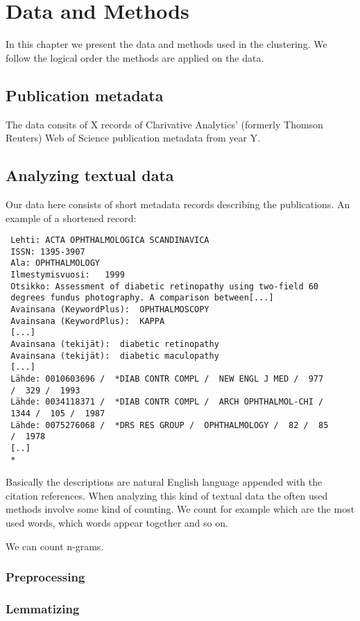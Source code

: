 \chapter{Data and Methods}
\label{chapter:methods}
In this chapter we present the data and methods used in the 
clustering. We follow the logical order the methods are applied on 
the data.

\section{Publication metadata}
The data consits of X records of Clarivative Analytics' 
(formerly Thomson Reuters) Web of Science publication metadata 
from year Y.


\section{Analyzing textual data}
Our data here consists of short metadata records describing the 
publications. An example of a shortened record:
\begin{verbatim}
 Lehti: ACTA OPHTHALMOLOGICA SCANDINAVICA
 ISSN: 1395-3907
 Ala: OPHTHALMOLOGY
 Ilmestymisvuosi:   1999
 Otsikko: Assessment of diabetic retinopathy using two-field 60 
 degrees fundus photography. A comparison between[...]
 Avainsana (KeywordPlus):  OPHTHALMOSCOPY
 Avainsana (KeywordPlus):  KAPPA
 [...]
 Avainsana (tekijät):  diabetic retinopathy
 Avainsana (tekijät):  diabetic maculopathy
 [...]
 Lähde: 0010603696 /  *DIAB CONTR COMPL /  NEW ENGL J MED /  977 
 /  329 /  1993
 Lähde: 0034118371 /  *DIAB CONTR COMPL /  ARCH OPHTHALMOL-CHI /  
 1344 /  105 /  1987
 Lähde: 0075276068 /  *DRS RES GROUP /  OPHTHALMOLOGY /  82 /  85 
 /  1978
 [..]
 * 
\end{verbatim}
Basically the descriptions are natural English 
language appended with the citation references. When analyzing 
this kind of textual data the often used methods involve some 
kind of counting. We count for example which
are the most used words, which words appear together and so on.

We can count n-grams.
\subsection{Preprocessing}
\subsection{Lemmatizing}

